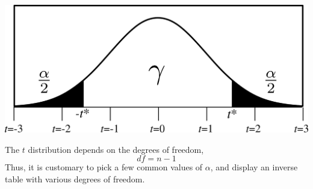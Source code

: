 \documentclass[12pt,letterpaper]{article}
\begin{document}
\begin{center}
\includegraphics[scale=0.7]{tcurve.png}
\end{center}

The $t$ distribution depends on the degrees of freedom, $$df=n-1$$ Thus, it is customary to pick a few common values of $\alpha$, and display an inverse table with various degrees of freedom.
\vspace{20pt}

{ \footnotesize
\begin{multicols}{5}

\end{multicols}
}
\end{document}
